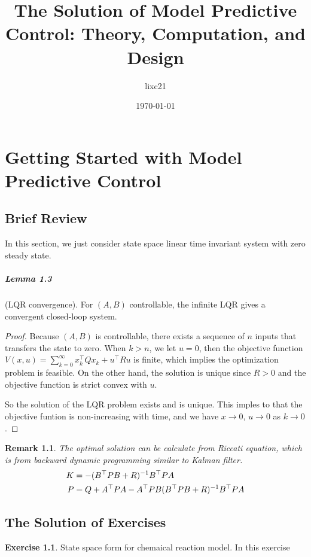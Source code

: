 \documentclass[11pt,a4paper]{report}
\title{The Solution of Model Predictive Control: Theory, Computation, and Design}
\author{lixc21}
\date{\today}
\begin{document}
\newtheorem*{remark}{Remark}
\theoremstyle{definition}\newtheorem{exercise}{Exercise}[chapter]

\maketitle

\chapter{Getting Started with Model Predictive Control}
\section{Brief Review}
In this section, we just consider state space linear time invariant system with zero steady state.

\paragraph{Lemma 1.3} (LQR convergence). For $(A,B)$ controllable, the infinite LQR gives a convergent closed-loop system.
\begin{proof}
Because $(A,B)$ is controllable, there exists a sequence of $n$ inputs that transfers the state to zero. When $k>n$, we let $u=0$, then the objective function $V(x,u)=\sum_{k=0}^\infty x_k^\top Qx_k+u^\top Ru$ is finite, which implies the optimization problem is feasible. On the other hand, the solution is unique since $R>0$ and the objective function is strict convex with $u$.

So the solution of the LQR problem exists and is unique. This imples to that the objective funtion is non-increasing with time, and we have $x\to 0$, $u\to 0$ as $k\to 0$.
\end{proof}
\begin{remark}
The optimal solution can be calculate from Riccati equation, which is from backward dynamic programming similar to Kalman filter.
\begin{equation}\notag
\begin{aligned}
K&=-(B^\top PB+R)^{-1} B^\top PA\\
P&=Q+A^\top PA-A^\top PB(B^\top PB+R)^{-1}B^\top PA
\end{aligned}
\end{equation}
\end{remark}





\section{The Solution of Exercises}
\begin{exercise} State space form for chemaical reaction model.\newline
In this exercise     
\end{exercise}
\end{document}
